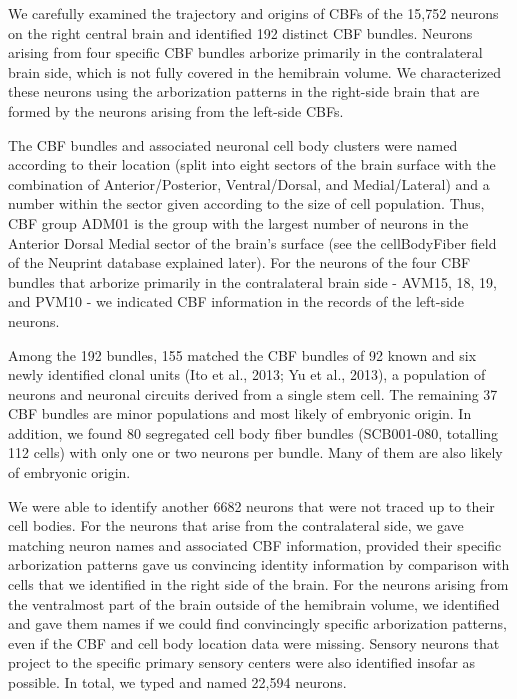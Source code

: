 \documentclass{article}
\begin{document}
We carefully examined the trajectory and origins of CBFs of the 15,752 neurons on the right central brain and identified 192 distinct CBF bundles. Neurons arising from four specific CBF bundles arborize primarily in the contralateral brain side, which is not fully covered in the hemibrain volume. We characterized these neurons using the arborization patterns in the right-side brain that are formed by the neurons arising from the left-side CBFs.

The CBF bundles and associated neuronal cell body clusters were named according to their location (split into eight sectors of the brain surface with the combination of Anterior/Posterior, Ventral/Dorsal, and Medial/Lateral) and a number within the sector given according to the size of cell population. Thus, CBF group ADM01 is the group with the largest number of neurons in the Anterior Dorsal Medial sector of the brain’s surface (see the cellBodyFiber field of the Neuprint database explained later). For the neurons of the four CBF bundles that arborize primarily in the contralateral brain side - AVM15, 18, 19, and PVM10 - we indicated CBF information in the records of the left-side neurons.

Among the 192 bundles, 155 matched the CBF bundles of 92 known and six newly identified clonal units (Ito et al., 2013; Yu et al., 2013), a population of neurons and neuronal circuits derived from a single stem cell. The remaining 37 CBF bundles are minor populations and most likely of embryonic origin. In addition, we found 80 segregated cell body fiber bundles (SCB001-080, totalling 112 cells) with only one or two neurons per bundle. Many of them are also likely of embryonic origin.

We were able to identify another 6682 neurons that were not traced up to their cell bodies. For the neurons that arise from the contralateral side, we gave matching neuron names and associated CBF information, provided their specific arborization patterns gave us convincing identity information by comparison with cells that we identified in the right side of the brain. For the neurons arising from the ventralmost part of the brain outside of the hemibrain volume, we identified and gave them names if we could find convincingly specific arborization patterns, even if the CBF and cell body location data were missing. Sensory neurons that project to the specific primary sensory centers were also identified insofar as possible. In total, we typed and named 22,594 neurons.
\end{document}
